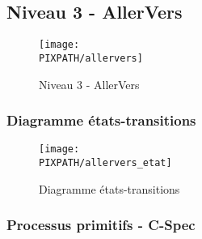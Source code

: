 \subsection{Niveau 3 - AllerVers}

\begin{center}
\begin{figure}[!h]
\texttt{[image: \\PIXPATH/allervers]}
\caption{Niveau 3 - AllerVers}
\end{figure}
\end{center}


\subsubsection{Diagramme états-transitions}

\begin{center}
\begin{figure}[!h]
\texttt{[image: \\PIXPATH/allervers\_etat]}
\caption{Diagramme états-transitions}
\end{figure}
\end{center}

\vfill
\pagebreak

\subsubsection{Processus primitifs - C-Spec}

